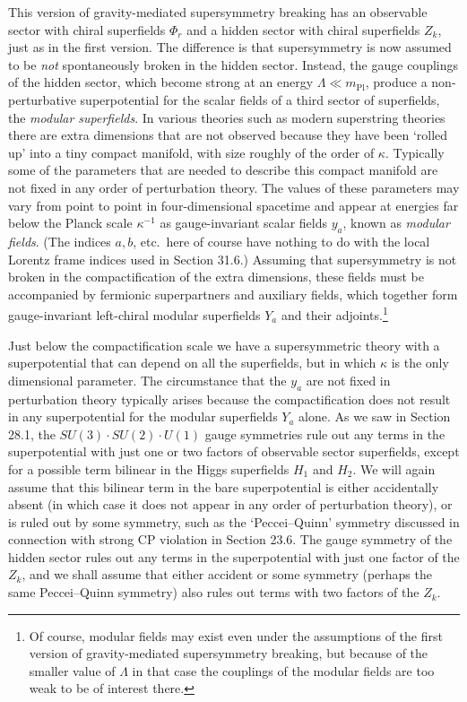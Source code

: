 This version of gravity-mediated supersymmetry breaking has an observable
sector with chiral superfields \(\Phi_r\) and a hidden sector with chiral
superfields \(Z_k\), just as in the first version. The difference is that
supersymmetry is now assumed to be \emph{not} spontaneously broken in the
hidden sector. Instead, the gauge couplings of the hidden sector, which
become strong at an energy \(\Lambda\ll m_{\mathrm{Pl}}\), produce a
non-perturbative superpotential for the scalar fields of a third sector of
superfields, the \emph{modular superfields}. In various theories such as
modern superstring theories there are extra dimensions that are not
observed because they have been `rolled up' into a tiny compact manifold,
with size roughly of the order of \(\kappa\). Typically some of the
parameters that are needed to describe this compact manifold are not fixed
in any order of perturbation theory. The values of these parameters may
vary from point to point in four-dimensional spacetime and appear at
energies far below the Planck scale \(\kappa^{-1}\) as gauge-invariant scalar
fields \(y_a\), known as \emph{modular fields}. (The indices \(a,b\), etc.\
here of course have nothing to do with the local Lorentz frame indices used
in Section 31.6.) Assuming that supersymmetry is not broken in the
compactification of the extra dimensions, these fields must be accompanied
by fermionic superpartners and auxiliary fields, which together form
gauge-invariant left-chiral modular superfields \(Y_a\) and their
adjoints.\footnote{Of course, modular fields may exist even under the
assumptions of the first version of gravity-mediated supersymmetry breaking,
but because of the smaller value of \(\Lambda\) in that case the couplings
of the modular fields are too weak to be of interest there.}

Just below the compactification scale we have a supersymmetric theory with a
superpotential that can depend on all the superfields, but in which
\(\kappa\) is the only dimensional parameter. The circumstance that the
\(y_a\) are not fixed in perturbation theory typically arises because the
compactification does not result in any superpotential for the modular
superfields \(Y_a\) alone. As we saw in Section 28.1, the
\(SU(3)\cdot SU(2)\cdot U(1)\) gauge symmetries rule out any terms in the
superpotential with just one or two factors of observable sector
superfields, except for a possible term bilinear in the Higgs superfields
\(H_1\) and \(H_2\). We will again assume that this bilinear term in the
bare superpotential is either accidentally absent (in which case it does not
appear in any order of perturbation theory), or is ruled out by some
symmetry, such as the `Peccei--Quinn' symmetry discussed in connection with
strong CP violation in Section 23.6. The gauge symmetry of the hidden sector
rules out any terms in the superpotential with just one factor of the
\(Z_k\), and we shall assume that either accident or some symmetry (perhaps
the same Peccei--Quinn symmetry) also rules out terms with two factors of
the \(Z_k\).


